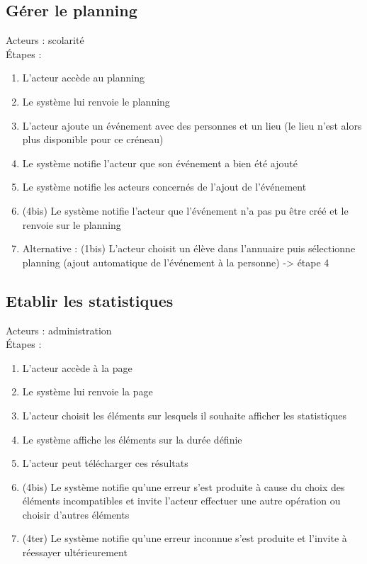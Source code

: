 \documentclass{scrreprt}
\begin{document}
\subsection{Gérer le planning}
Acteurs : scolarité
\\
\'Etapes : 
\begin{enumerate}
\item L’acteur accède au planning
\item Le système lui renvoie le planning
\item L’acteur ajoute un événement avec des personnes et un lieu (le lieu n’est alors plus disponible pour ce créneau) 
\item Le système notifie l’acteur que son événement a bien été ajouté
\item Le système notifie les acteurs concernés de l’ajout de l’événement
\item (4bis) Le système notifie l’acteur que l’événement n’a pas pu être créé et le renvoie sur le planning
\item Alternative : (1bis) L’acteur choisit un élève dans l’annuaire puis sélectionne planning (ajout automatique de l’événement à la personne) -> étape 4
\end{enumerate}


\subsection{Etablir les statistiques}
Acteurs : administration
\\
\'Etapes : 
\begin{enumerate}
\item L’acteur accède à la page
\item Le système lui renvoie la page
\item L’acteur choisit les éléments sur lesquels il souhaite afficher les statistiques
\item Le système affiche les éléments sur la durée définie
\item L’acteur peut télécharger ces résultats
\item (4bis) Le système notifie qu’une erreur s’est produite à cause du choix des éléments incompatibles et invite l’acteur effectuer une autre opération ou choisir d’autres éléments
\item (4ter) Le système notifie qu’une erreur inconnue s’est produite et l’invite à réessayer ultérieurement
\end{enumerate}
\end{document}
